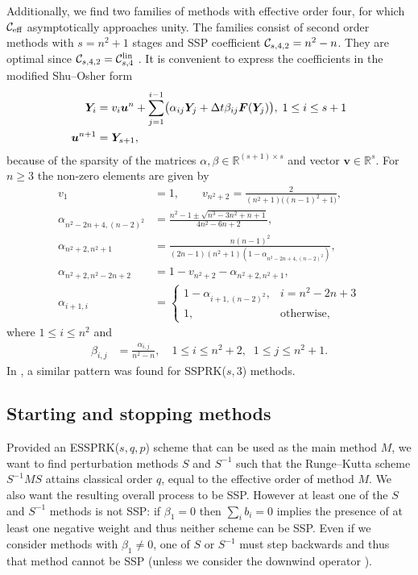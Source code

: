 \documentclass{siamltex}  %
\begin{document}
Additionally, we find two families of methods with effective order four, 
for which $\mathcal{C}_{\textnormal{eff}}$ asymptotically approaches unity.
The families consist of second order methods with $s = n^2+1$ stages and 
SSP coefficient $\mathcal{C}_{s,4,2} = n^2-n$.
They are optimal since $\mathcal{C}_{s,4,2}  = \mathcal{C}^{\textnormal{lin}}_{s,4}$ 
\cite[Theorem~5.2(c)]{Kraaijevanger1986}.
It is convenient to express the coefficients in the modified Shu--Osher form
\cite{Gottlieb2011a}
\begin{align*}
	\bm{Y}_i &= v_i\bm{u}^n + \sum_{j=1}^{i-1}\bigl(\alpha_{ij}\bm{Y}_j + \Delta t\beta_{ij}\bm{F}(\bm{Y}_j)\bigr), \; 1 \leq i \leq s+1 \\
	\bm{u}^{n+1} &= \bm{Y}_{s+1},
\end{align*}
because of the sparsity of the matrices $\alpha, \beta \in \mathbb{R}^{(s+1)\times s}$
and vector $\bm{v} \in \mathbb{R}^s$.
For $n \geq 3$ the non-zero elements are given by
\begin{align*}
	v_1 &= 1, \quad\quad v_{n^2+2} = \frac{2}{(n^2+1)\bigl((n-1)^2+1\bigr)}, \\
	\alpha_{n^2-2n+4,(n-2)^2} &= \frac{n^2-1 \pm \sqrt{n^3-3n^2+n+1}}{4n^2-6n+2}, \\ 		
	\alpha_{n^2+2,n^2+1} &= \frac{n(n-1)^2}{(2n-1)(n^2+1)(1-\alpha_{n^2-2n+4,(n-2)^2})}, \\
	\alpha_{n^2+2,n^2-2n+2} &= 1 - v_{n^2+2} - \alpha_{n^2+2,n^2+1}, \\
	\alpha_{i+1,i} &= \begin{cases} 
								1 - \alpha_{i+1,(n-2)^2}, & i = n^2-2n+3 \\
								1,  &\mbox{otherwise,}
							\end{cases}
\end{align*}
where $ 1 \leq i \leq n^2$ and 
\begin{align*}
	\beta_{i,j} & = \frac{\alpha_{i,j}}{n^2-n}, \quad 1 \leq i \leq n^2+2, \;\; 1 \leq j \leq n^2+1.
\end{align*}
In \cite[\S~6.2.2]{Gottlieb2011a}, a similar pattern was found for SSPRK($s,3$) methods.

\subsection{Starting and stopping methods}\label{subsec:starting_stopping}
Provided an ESSPRK($s,q,p$) scheme that can be used as the main 
method $M$, we want to find perturbation methods $S$ and $S^{-1}$ such that the 
Runge--Kutta scheme $S^{-1}MS$ attains classical order $q$, equal to the 
effective order of method $M$.
We also want the resulting overall process to be SSP.
However at least one of the $S$ and $S^{-1}$ methods is not SSP:
if $\beta_1 = 0$ then $\sum_i b_i = 0$ implies the presence of at
least one negative weight and thus neither scheme can be SSP.
Even if we consider methods with $\beta_1 \neq 0$, one of $S$ or
$S^{-1}$ must step backwards and thus that method cannot be SSP
(unless we consider the downwind operator
\cite{Ruuth2004,Gottlieb/Ruuth:SSPfastdownwind,Ketcheson:2011:downwind}).
\end{document}
